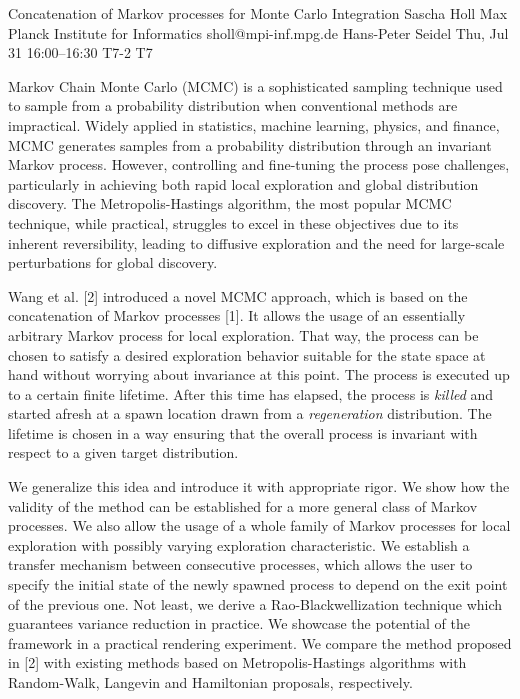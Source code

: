 \begin{talk}
  {Concatenation of Markov processes for Monte Carlo Integration}%
  {Sascha Holl}%
  {Max Planck Institute for Informatics}%
  {sholl@mpi-inf.mpg.de}%
  {Hans-Peter Seidel}%
  {}%
  {Thu, Jul 31 16:00–16:30}%
  {T7-2}%
  {T7}%
  
				

Markov Chain Monte Carlo (MCMC) is a sophisticated sampling technique used to sample from a probability distribution when conventional methods are impractical. Widely applied in statistics, machine learning, physics, and finance, MCMC generates samples from a probability distribution through an invariant Markov process. However, controlling and fine-tuning the process pose challenges, particularly in achieving both rapid local exploration and global distribution discovery. The Metropolis-Hastings algorithm, the most popular MCMC technique, while practical, struggles to excel in these objectives due to its inherent reversibility, leading to diffusive exploration and the need for large-scale perturbations for global discovery.

Wang et al. [2] introduced a novel MCMC approach, which is based on the concatenation of Markov processes [1]. It allows the usage of an essentially arbitrary Markov process for local exploration. That way, the process can be chosen to satisfy a desired exploration behavior suitable for the state space at hand without worrying about invariance at this point. The process is executed up to a certain finite lifetime. After this time has elapsed, the process is \textit{killed} and started afresh at a spawn location drawn from a \textit{regeneration} distribution. The lifetime is chosen in a way ensuring that the overall process is invariant with respect to a given target distribution.

We generalize this idea and introduce it with appropriate rigor. We show how the validity of the method can be established for a more general class of Markov processes. We also allow the usage of a whole family of Markov processes for local exploration with possibly varying exploration characteristic. We establish a transfer mechanism between consecutive processes, which allows the user to specify the initial state of the newly spawned process to depend on the exit point of the previous one. Not least, we derive a Rao-Blackwellization technique which guarantees variance reduction in practice.
We showcase the potential of the framework in a practical rendering experiment. We compare the method proposed in [2] with existing methods based on Metropolis-Hastings algorithms with Random-Walk, Langevin and Hamiltonian proposals, respectively.


\end{talk}

